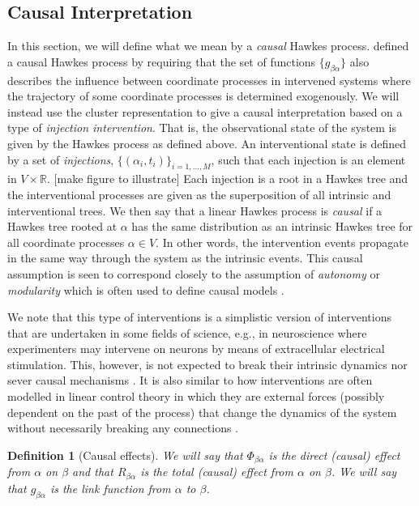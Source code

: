 \documentclass[accepted]{uai2021} %
\newtheorem{defn}[thm]{Definition}
\begin{document}

\subsection{Causal Interpretation}

In this section, we will define what we mean by a {\it causal} Hawkes process. 
\cite{mogensenUAI2020} defined a causal Hawkes process by requiring that the 
set 
of functions $\{g_{\beta\alpha}\}$ also describes the influence between 
coordinate processes in intervened systems where the trajectory of some 
coordinate processes is determined exogenously. We will instead use the cluster 
representation to give a causal
interpretation based on a type of \emph{injection intervention}. That is, the 
observational state of the system is given by the Hawkes process as defined 
above. An interventional state is defined by a set of \emph{injections}, 
$\{(\alpha_i, t_i) \}_{i =1,\ldots, M} $, such that each injection is an 
element in $V\times \mathbb{R}$. [make figure to illustrate] Each injection is 
a root in a Hawkes tree and the interventional processes are given as the 
superposition of all intrinsic and interventional trees. We then say that a 
linear Hawkes process is {\it 
causal} if a Hawkes tree rooted at $\alpha$ has the same distribution as an 
intrinsic Hawkes tree for all coordinate processes $\alpha \in V$. In 
other words, the intervention events 
propagate in the same way through the system as the intrinsic events. This 
causal assumption is seen to correspond closely to 
the assumption of \emph{autonomy} or \emph{modularity} which is often used to 
define causal models 
\citep{pearl2009, petersElements2017}.

We note that this type of interventions is a simplistic version of 
interventions that are undertaken in some fields of 
science, e.g., in neuroscience where experimenters may intervene on neurons by 
means of extracellular electrical stimulation. This, however, is not expected 
to break their intrinsic dynamics nor 
sever causal mechanisms \citep{meffin2012, komarov2019}. It is also similar to 
how interventions are 
often 
modelled in linear control theory in which they are external forces (possibly 
dependent on the past of the process) that change the dynamics of the system 
without necessarily breaking any connections \citep{aastrom2008, zabczyk2020}.

\begin{defn}[Causal effects]
	We will say that $\Phi_{\beta\alpha}$ is the \emph{direct (causal) effect} 
	from 
	$\alpha$ on $\beta$ and that $R_{\beta\alpha}$ is the \emph{total (causal) 
	effect} from $\alpha$ on $\beta$. We will say that $g_{\beta\alpha}$ is the 
	{\it link function} from $\alpha$ to $\beta$.
	\label{def:cauEff}
\end{defn}
\end{document}
